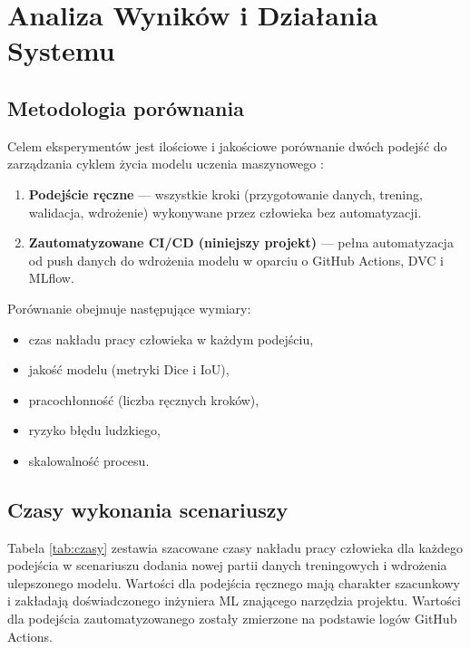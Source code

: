 \section{Analiza Wyników i Działania Systemu}
\label{sec:Analiza_wynikow}

\subsection{Metodologia porównania}

Celem eksperymentów jest ilościowe i jakościowe porównanie dwóch podejść do zarządzania cyklem życia modelu uczenia maszynowego \cite{kreuzberger2023mlops}:

\begin{enumerate}
  \item \textbf{Podejście ręczne} --- wszystkie kroki (przygotowanie danych, trening, walidacja, wdrożenie) wykonywane przez człowieka bez automatyzacji.
  \item \textbf{Zautomatyzowane CI/CD (niniejszy projekt)} --- pełna automatyzacja od push danych do wdrożenia modelu w oparciu o GitHub Actions, DVC i MLflow.
\end{enumerate}

Porównanie obejmuje następujące wymiary:
\begin{itemize}
  \item czas nakładu pracy człowieka w każdym podejściu,
  \item jakość modelu (metryki Dice i IoU),
  \item pracochłonność (liczba ręcznych kroków),
  \item ryzyko błędu ludzkiego,
  \item skalowalność procesu.
\end{itemize}

\subsection{Czasy wykonania scenariuszy}

Tabela \ref{tab:czasy} zestawia szacowane czasy nakładu pracy człowieka dla każdego podejścia w scenariuszu dodania nowej partii danych treningowych i wdrożenia ulepszonego modelu. Wartości dla podejścia ręcznego mają charakter szacunkowy i zakładają doświadczonego inżyniera ML znającego narzędzia projektu. Wartości dla podejścia zautomatyzowanego zostały zmierzone na podstawie logów GitHub Actions.

